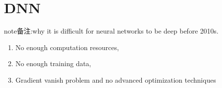 \documentclass[letterpaper,10pt,english]{sphinxmanual}
\begin{document}
\section{DNN}
\label{\detokenize{AI/main:dnn}}
\begin{sphinxadmonition}{note}{备注:}{why it is difficult for neural networks to be deep before 2010s.}
\begin{enumerate}
%
\item {} 
\sphinxAtStartPar
No enough computation resources,

\item {} 
\sphinxAtStartPar
No enough training data,

\item {} 
\sphinxAtStartPar
Gradient vanish problem and no advanced optimization techniques

\end{enumerate}
\end{sphinxadmonition}
\end{document}
